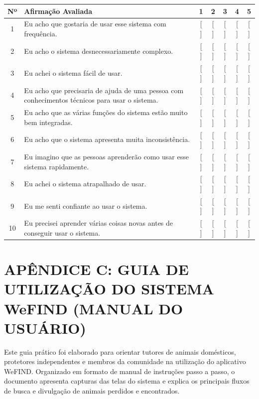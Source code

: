 \vspace{0.5cm}
\begin{table}[H]
\centering
\small
\begin{tabular}{|c|>{\raggedright\arraybackslash}p{8.8cm}|c|c|c|c|c|}
\hline
Nº & Afirmação Avaliada & 1 & 2 & 3 & 4 & 5 \\ \hline
1 & Eu acho que gostaria de usar esse sistema com frequência. & [ ] & [ ] & [ ] & [ ] & [ ] \\ \hline
2 & Eu acho o sistema desnecessariamente complexo. & [ ] & [ ] & [ ] & [ ] & [ ] \\ \hline
3 & Eu achei o sistema fácil de usar. & [ ] & [ ] & [ ] & [ ] & [ ] \\ \hline
4 & Eu acho que precisaria de ajuda de uma pessoa com conhecimentos técnicos para usar o sistema. & [ ] & [ ] & [ ] & [ ] & [ ] \\ \hline
5 & Eu acho que as várias funções do sistema estão muito bem integradas. & [ ] & [ ] & [ ] & [ ] & [ ] \\ \hline
6 & Eu acho que o sistema apresenta muita inconsistência. & [ ] & [ ] & [ ] & [ ] & [ ] \\ \hline
7 & Eu imagino que as pessoas aprenderão como usar esse sistema rapidamente. & [ ] & [ ] & [ ] & [ ] & [ ] \\ \hline
8 & Eu achei o sistema atrapalhado de usar. & [ ] & [ ] & [ ] & [ ] & [ ] \\ \hline
9 & Eu me senti confiante ao usar o sistema. & [ ] & [ ] & [ ] & [ ] & [ ] \\ \hline
10 & Eu precisei aprender várias coisas novas antes de conseguir usar o sistema. & [ ] & [ ] & [ ] & [ ] & [ ] \\ \hline
\end{tabular}
\end{table}

\clearpage

\section*{APÊNDICE C: GUIA DE UTILIZAÇÃO DO SISTEMA WeFIND (MANUAL DO USUÁRIO)}
{}

Este guia prático foi elaborado para orientar tutores de animais domésticos, protetores independentes e membros da comunidade na utilização do aplicativo WeFIND. Organizado em formato de manual de instruções passo a passo, o documento apresenta capturas das telas do sistema e explica os principais fluxos de busca e divulgação de animais perdidos e encontrados.


